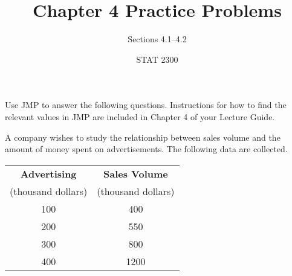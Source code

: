 \documentclass[noanswers]{exam}
\title{Chapter 4 Practice Problems}
\author{Sections 4.1--4.2}
\date{STAT 2300}
\begin{document}
%

\noindent Use JMP to answer the following questions. Instructions for how to find the relevant values in JMP are included in Chapter 4 of your Lecture Guide.

\begin{questions} 

\question A company wishes to study the relationship between sales volume and the amount of money spent on advertisements. The following data are collected.

\begin{center}
\begin{tabular}{|c|c|}
\hline
\textbf{Advertising} & \textbf{Sales Volume} \\
(thousand dollars) & (thousand dollars) \\
\hline
100 & 400 \\
\hline
200 & 550 \\
\hline
300 & 800 \\
\hline
400 & 1200 \\
\hline
\end{tabular}
\end{center}

\vspace{2mm}

\end{questions}
\end{document}

